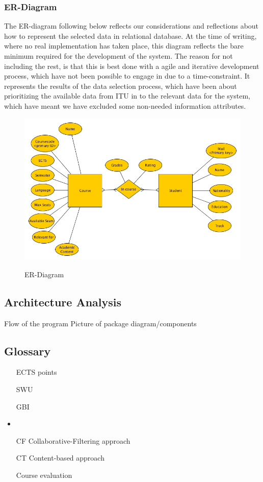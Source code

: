 \subsubsection{ER-Diagram}
The ER-diagram following below reflects our considerations and reflections about how to represent the selected data in relational database. At the time of writing, where no real implementation has taken place, this diagram reflects the bare minimum required for the development of the system. The reason for not including the rest, is that this is best done with a agile and iterative development process, which have not been possible to engage in due to a time-constraint. It represents the results of the data selection process, which have been about prioritizing the available data from ITU in to the relevant data for the system, which have meant we have excluded some non-needed information attributes.

\begin{figure}[H]
\centering
\includegraphics[scale=0.5]{Pictures/ER-Diagram.jpg}
\label{ER-diagram}
\caption{ER-Diagram}
\end{figure}

\subsection{Architecture Analysis}
Flow of the program
Picture of package diagram/components

\subsection{Glossary}
\begin{itemize}
	\item[ECTS points] 
	\item[SWU]
	\item[GBI]
	\item {}
	\item[CF] Collaborative-Filtering approach
	\item[CT] Content-based approach
	\item[Course evaluation]
\end{itemize}
